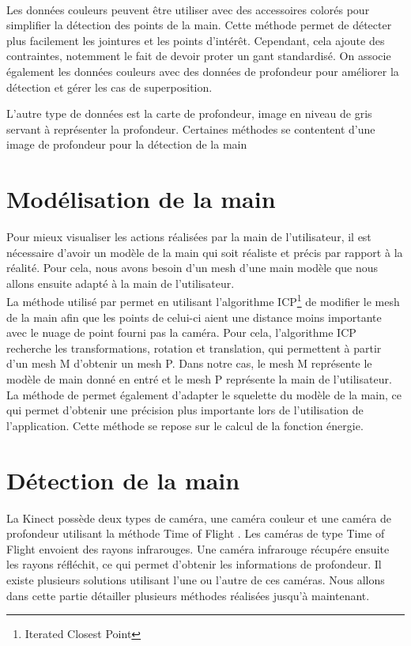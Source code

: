 \ \\
Les données couleurs peuvent être utiliser avec des accessoires colorés pour simplifier la détection des points de la main. \cite{wang2009real} 
Cette méthode permet de détecter plus facilement les jointures et les points d'intér\^{e}t. 
Cependant, cela ajoute des contraintes, notemment le fait de devoir proter un gant standardisé.
On associe également les données couleurs avec des données de profondeur pour améliorer la détection et gérer les cas de superposition. \cite{van2011combining}

L'autre type de données est la carte de profondeur, image en niveau de gris servant à représenter la profondeur. Certaines méthodes se contentent d'une image de profondeur pour la détection de la main \cite{export:238453}

\section{Modélisation de la main}
Pour mieux visualiser les actions réalisées par la main de l'utilisateur, il est nécessaire d'avoir
un modèle de la main qui soit réaliste et précis par rapport à la réalité. Pour cela, nous avons besoin d'un
mesh d'une main modèle que nous allons ensuite adapté à la main de l'utilisateur.\\

La méthode utilisé par \cite{export:217428} permet en utilisant l'algorithme
ICP\footnote{Iterated Closest Point} \cite{121791} de modifier le mesh de la main afin
que les points de celui-ci aient une distance moins importante avec le nuage de point fourni pas la 
caméra. Pour cela, l'algorithme ICP recherche les transformations, rotation et translation, qui permettent 
à partir d'un mesh M d'obtenir un mesh P. Dans notre cas, le mesh M représente le modèle de main donné en entré
et le mesh P représente la main de l'utilisateur.\\ 

La méthode de \cite{export:217428} permet également d'adapter le squelette du modèle de la 
main, ce qui permet d'obtenir une précision plus importante lors de l'utilisation de l'application.
Cette méthode se repose sur le calcul de la fonction énergie.

\section{Détection de la main}

La Kinect possède deux types de caméra, une caméra couleur et une caméra de profondeur utilisant la méthode 
\og Time of Flight \fg. Les caméras de type \og Time of Flight \fg envoient des rayons infrarouges. Une caméra infrarouge
récupére ensuite les rayons réfléchit, ce qui permet d'obtenir les informations de profondeur. 
Il existe plusieurs solutions utilisant l'une ou l'autre de ces caméras. Nous allons
dans cette partie détailler plusieurs méthodes réalisées jusqu'à maintenant.

